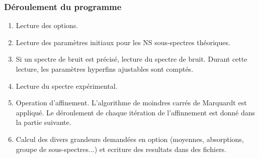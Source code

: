 \subsubsection{Déroulement du programme}
\begin{enumerate}
\item Lecture des options.
\item Lecture des paramètres initiaux pour les NS sous-spectres théoriques. 
\item Si un spectre de bruit est précisé, lecture du spectre de bruit.
  Durant cette lecture, les paramètres hyperfins ajustables sont comptés.
\item Lecture du spectre expérimental.
\item Operation d'affinement. L'algorithme de moindres carrés de Marquardt est appliqué. 
  Le déroulement de chaque itération de l'affinnement est donné dans la partie suivante.
\item Calcul des divers grandeurs demandées en option (moyennes, absorptions, groupe de sous-spectres...)
  et ecriture des resultats dans des fichiers. 
\end{enumerate}
